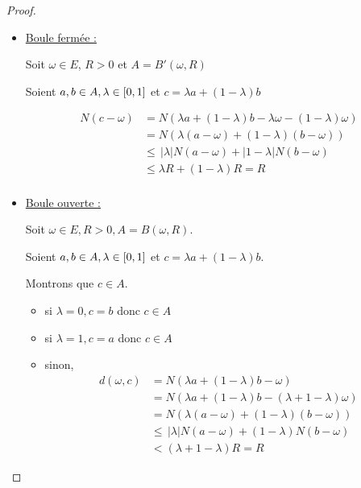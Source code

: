 
\begin{proof}~

    \begin{itemize}
        \item \uline{Boule fermée :}

        Soit $\omega \in E$, $R > 0$ et $A = B'( \omega, R)$
    
        Soient $a, b \in A, \lambda \in \left[0, 1\right]$ et $c = \lambda a + (1 - \lambda)b$

        \begin{align*}
            N(c - \omega) & = N(\lambda a + (1 - \lambda)b - \lambda \omega - (1 - \lambda) \omega) \\
            & = N(\lambda(a - \omega) + (1 - \lambda)(b - \omega)) \\
            & \leqslant \, |\lambda| N(a - \omega) + |1 - \lambda| N(b - \omega) \\
            & \leqslant \lambda R + (1 - \lambda)R = R \\
        \end{align*}

        \item \underline{Boule ouverte :}

        Soit $\omega  \in E, R > 0, A = B(\omega, R)$. 

        Soient $a, b \in A, \lambda \in \left[0, 1\right]$ et $c = \lambda a + (1 - \lambda)b$.

        Montrons que $c \in A$. 
        \begin{itemize}
            \item si $\lambda = 0, c = b$ donc $c \in A$
            \item si $\lambda = 1, c = a$ donc $c \in A$
            \item sinon, 
                \begin{align*}
                    d(\omega, c) & = N(\lambda a + (1 - \lambda) b - \omega) \\
                    & = N(\lambda a + (1 - \lambda) b - (\lambda + 1- \lambda) \omega) \\
                    & = N(\lambda(a - \omega) + (1 - \lambda) (b - \omega)) \\
                    & \leqslant \, |\lambda| N(a - \omega) + (1 - \lambda)N(b - \omega) \\
                    & < (\lambda + 1 - \lambda) R = R
                \end{align*}
        \end{itemize}
    \end{itemize}
\end{proof}

